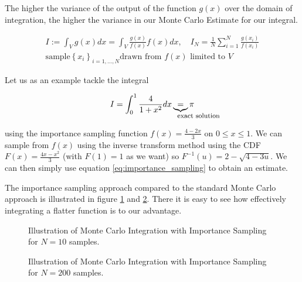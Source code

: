 The higher the variance of the output of the function $g(x)$ over the domain of integration, the higher
the variance in our Monte Carlo Estimate for our integral. 

\begin{equation}
    \begin{multlined}
        I := \int_{V} g(x) dx = \int_{V} \frac{g(x)}{f(x)} f(x) dx, \quad I_N = \frac{1}{N} \sum_{i=1}^{N} \frac{g(x_i)}{f(x_i)} \\
        \text{sample} \left\{x_i\right\}_{i=1,...,N} \text{drawn from } f(x) \text{ limited to } V
    \end{multlined}
    \label{eq:importance_sampling}
\end{equation}

Let us as an example tackle the integral

\begin{equation}
    I = \int_{0}^{1} \frac{4}{1+x^2} dx \explain{=}{\text{exact solution}} \pi
\end{equation}

using the importance sampling function $f(x) = \frac{4 - 2x}{3}$ on $0 \leq x \leq 1$. We can sample
from $f(x)$ using the inverse transform method using the CDF $F(x) = \frac{4x - x^2}{3}$ (with $F(1) = 1$ as we want) so $F^{-1}(u) = 2 - \sqrt{4 - 3u}$. We can then
simply use equation \ref{eq:importance_sampling} to obtain an estimate.

The importance sampling approach compared to the standard Monte Carlo approach is illustrated in figure \ref{fig:mc_impA} and \ref{fig:mc_impB}. There it is easy to see how
effectively integrating a flatter function is to our advantage.


\begin{figure}[!htb]
    \centering
    \hfill
    \caption{Illustration of Monte Carlo Integration with Importance Sampling for $N=10$ samples.}
    \label{fig:mc_impA}
\end{figure}

\begin{figure}[!htb]
    \centering
    \hfill
    \caption{Illustration of Monte Carlo Integration with Importance Sampling for $N=200$ samples.}
    \label{fig:mc_impB}
\end{figure}

